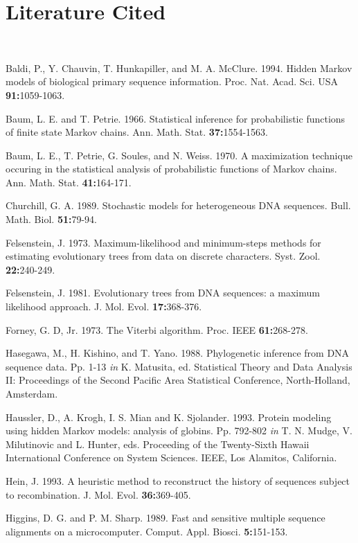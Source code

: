 \documentclass[12pt]{article}
\begin{document}
{\parindent=-0.2in

\section*{\sc Literature Cited}

{~~}

{\sc Baldi, P., Y. Chauvin, T. Hunkapiller,} and {\sc M. A. McClure.}  1994.
Hidden Markov models of biological primary sequence information. 
Proc. Nat. Acad. Sci. USA {\bf 91:}1059-1063.

{\sc Baum, L. E.} and {\sc T. Petrie.} 1966. Statistical inference for probabilistic
functions of finite state Markov chains.  Ann. Math. Stat. {\bf 37:}1554-1563.

{\sc Baum, L. E., T. Petrie, G. Soules,} and {\sc N. Weiss.}  1970. A maximization
technique occuring in the statistical analysis of probabilistic functions of
Markov chains.  Ann. Math. Stat. {\bf 41:}164-171.

{\sc Churchill, G. A.}  1989.  Stochastic models for heterogeneous DNA sequences.
Bull. Math. Biol. {\bf 51:}79-94.

{\sc Felsenstein, J.}  1973.  Maximum-likelihood and minimum-steps methods for
estimating evolutionary trees from data on discrete characters. Syst.
Zool. {\bf 22:}240-249.

{\sc Felsenstein, J.} 1981.  Evolutionary trees from  DNA  sequences:  a maximum
likelihood approach. J. Mol. Evol. {\bf 17:}368-376.

{\sc Forney, G. D, Jr.}  1973.  The Viterbi algorithm.  Proc. IEEE
{\bf 61:}268-278.

{\sc Hasegawa, M., H. Kishino,} and {\sc T. Yano.}  1988.  Phylogenetic inference from
DNA sequence data.  Pp. 1-13 {\it in} {\sc K. Matusita,} ed.
Statistical Theory and Data Analysis II:
Proceedings of the Second Pacific Area Statistical Conference,
North-Holland, Amsterdam.

{\sc Haussler, D., A. Krogh, I. S. Mian} and {\sc K. Sjolander.} 1993.
Protein modeling using hidden Markov models: analysis of globins. Pp. 792-802
{\it in} {\sc T. N. Mudge, V. Milutinovic} and {\sc L. Hunter,} eds.
Proceeding of the Twenty-Sixth Hawaii International Conference
on System Sciences. IEEE, Los Alamitos, California.

{\sc Hein, J.} 1993. A heuristic method to reconstruct the history of sequences
subject to recombination.
J. Mol. Evol. {\bf 36:}369-405.

{\sc Higgins, D. G.} and {\sc P. M. Sharp.}  1989.  Fast and sensitive multiple sequence
alignments on a microcomputer.  Comput. Appl. Biosci. {\bf 5:}151-153.

}
\end{document}
